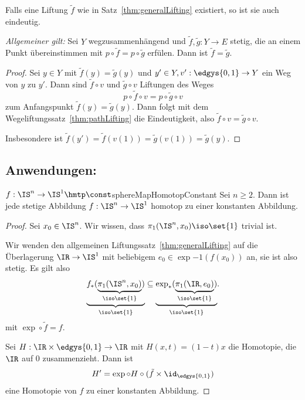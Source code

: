 \documentclass[language=ngerman]{TemplateLecture} %
\begin{document}
\begin{remark}
    Falls eine Liftung $\tilde{f}$ wie in Satz~\ref{thm:generalLifting} existiert, so ist sie auch eindeutig. 
    
    \emph{Allgemeiner gilt:} Sei $Y$ wegzusammenhängend und $\tilde{f}, \tilde{g}: Y \to E$ stetig, die an einem Punkt übereinstimmen mit $p \circ \tilde{f} = p \circ \tilde{g}$ erfülen. Dann ist $\tilde{f} = \tilde{g}$.
\end{remark}
\begin{proof}
    Sei $y \in Y$ mit $\tilde{f}(y) = \tilde{g}(y)$ und $y' \in Y, v': \edgys{0,1} \to Y$ ein Weg von $y$ zu $y'$. Dann sind $\tilde{f} \circ v$ und $\tilde{g} \circ v$ Liftungen des Weges 
    \begin{equation*}
        p \circ \tilde{f} \circ v = p \circ \tilde{g} \circ v
    \end{equation*}
    zum Anfangspunkt $\tilde{f}(y) = \tilde{g}(y)$. Dann folgt mit dem Wegeliftungssatz~\ref{thm:pathLifting} die Eindeutigkeit, also $\tilde{f} \circ v = \tilde{g} \circ v$.

    Insbesondere ist $\tilde{f}(y') = \tilde{f}(v(1)) = \tilde{g}(v(1)) = \tilde{g}(y)$.
\end{proof}

\subsection*{Anwendungen:}

\begin{thm}{$f: \IS^n \to \IS^1 \hmtp \const$}{sphereMapHomotopConstant}
    Sei $n \geq 2$. Dann ist jede stetige Abbildung $f: \IS^n \to \IS^1$ homotop zu einer konstanten Abbildung.
\end{thm}
\begin{proof}
    Sei $x_0 \in \IS^n$. Wir wissen, dass $\pi_1(\IS^n, x_0) \iso \set{1}$ trivial ist.
    
    Wir wenden den allgemeinen Liftungssatz~\ref{thm:generalLifting} auf die Überlagerung $\IR \to \IS^1$ mit beliebigem $e_0 \in \exp{-1}(f(x_0))$ an, sie ist also stetig. Es gilt also 
    \begin{equation*}
        \underset{\iso \set{1}}{\underbrace{f_*(\underset{\iso \set{1}}{\underbrace{\pi_1(\IS^n, x_0)}})}} \subseteq \underset{\iso \set{1}}{\underbrace{\exp_*(\underset{\iso \set{1}}{\underbrace{\pi_1(\IR, e_0)}})}}.
    \end{equation*}
    mit $\exp \circ \tilde{f} = f$.

    Sei $H : \IR \times \edgys{0,1} \to \IR$ mit $H(x, t) = (1-t)x$ die Homotopie, die $\IR$ auf 0 zusammenzieht. Dann ist 
    \begin{equation*}
        H' = \exp \circ H \circ (\tilde{f} \times \id_{\edgys{0,1}})
    \end{equation*}
    eine Homotopie von $f$ zu einer konstanten Abbildung.
\end{proof}
\end{document}
